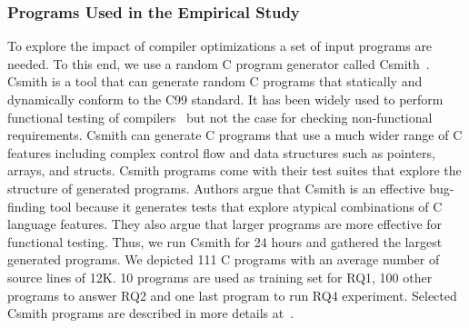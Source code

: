 \subsubsection{Programs Used in the Empirical Study}
To explore the impact of compiler optimizations a set of input programs are needed. 
To this end, we use a random C program generator called Csmith~\cite{yang2011finding}.
Csmith is a tool that can generate random C programs that statically and dynamically conform to the C99 standard. It has been widely used to perform functional testing of compilers~\cite{chen2016empirical,le2014compiler,nagai2013scaling} but not the case for checking non-functional requirements. Csmith can generate C programs that use a much wider range of C features including complex control flow and data structures such as pointers, arrays, and structs. Csmith programs come with their test suites that explore the structure of generated programs. 
Authors argue that Csmith is an effective bug-finding tool because it generates tests that explore atypical combinations of C language features. They also argue that larger programs are more effective for functional testing. Thus, we run Csmith for 24 hours and gathered the largest generated programs. We depicted 111 C programs with an average number of source lines of 12K. 10 programs are used as training set for RQ1, 100 other programs to answer RQ2 and one last program to run RQ4 experiment.
Selected Csmith programs are described in more details at~\cite{mboussaa}.

